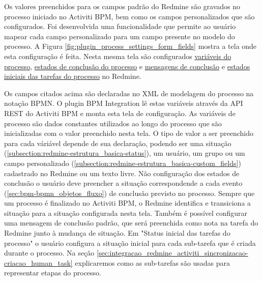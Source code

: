 Os valores preenchidos para os campos padrão do Redmine são gravados no processo iniciado no Activiti BPM, bem como os campos personalizados que são configurados. Foi desenvolvida uma funcionalidade que permite ao usuário mapear cada campo personalizado para um campo presente no modelo do processo. A Figura \ref{fig:plugin_process_settings_form_fields} mostra a tela onde esta configuração é feita. Nesta mesma tela são configurados \underline{variáveis do processo},  \underline{estados de conclusão do processo} e \underline{mensagens de conclusão} e \underline{estados iniciais das tarefas do processo} no Redmine. 

Os campos citados acima são declaradas no XML de modelagem do processo na notação BPMN. O plugin BPM Integration lê estas variáveis através da API REST do Activiti BPM e monta esta tela de configuração.
As variáveis de processo são dados constantes utilizados ao longo do processo que são inicializadas com o valor preenchido nesta tela. O tipo de valor a ser preenchido para cada váriável depende de sua declaração, podendo ser uma situação (\ref{subsection:redmine-estrutura_basica-status}), um usuário, um grupo ou um campo personalizado (\ref{subsection:redmine-estrutura_basica-custom_fields}) cadastrado no Redmine ou um texto livre. Não configuração dos estados de conclusão o usuário deve preencher a situação correspondende a cada evento (\ref{sec:bpm-bpmn_objetos_fluxo}) de conclusão previsto no processo. Sempre que um processo é finalizado no Activiti BPM, o Redmine identifica e transiciona a situação para a situação configurada nesta tela. Também é possível configurar uma mensagem de conclusão padrão, que será preenchida como nota na tarefa do Redmine junto à mudança de situação. Em "Status inicial das tarefas do processo" o usuário configura a situação inicial para cada sub-tarefa que é criada durante o processo. Na seção \ref{sec:integracao_redmine_activiti_sincronizacao-criacao_human_task} explicaremos como as sub-tarefas são usadas para representar etapas do processo.

